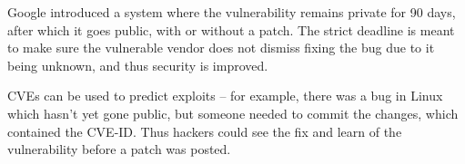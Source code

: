 Google introduced a system where the vulnerability remains private for 90 days, after which it goes public, with or without a patch. The strict deadline is meant to make sure the vulnerable vendor does not dismiss fixing the bug due to it being unknown, and thus security is improved.


CVEs can be used to predict exploits – for example, there was a bug in Linux which hasn’t yet gone public, but someone needed to commit the changes, which contained the CVE-ID. Thus hackers could see the fix and learn of the vulnerability before a patch was posted.
